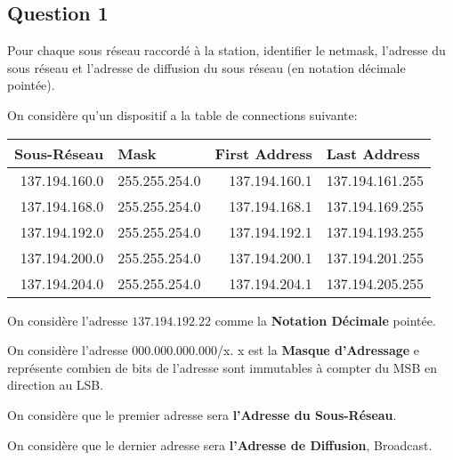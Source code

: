 \documentclass{article}
\begin{document}
\subsection*{Question 1}
\begin{exercise}
    Pour chaque sous réseau raccordé à la station, identifier le netmask, l'adresse du sous réseau et l'adresse de diffusion du sous réseau (en notation décimale pointée).
\end{exercise}
\begin{resolution}
    On considère qu'un dispositif a la table de connections suivante:
    \begin{table}[H]
        \centering\begin{tabular}{rl | rl}
            Sous-Réseau & Mask    & First Address & Last Address\\
            \hline\hline
            137.194.160.0 & 255.255.254.0 & 137.194.160.1 & 137.194.161.255\\
            137.194.168.0 & 255.255.254.0 & 137.194.168.1 & 137.194.169.255\\
            137.194.192.0 & 255.255.254.0 & 137.194.192.1 & 137.194.193.255\\
            137.194.200.0 & 255.255.254.0 & 137.194.200.1 & 137.194.201.255\\
            137.194.204.0 & 255.255.254.0 & 137.194.204.1 & 137.194.205.255\\
            \hline
        \end{tabular}
    \end{table}
    
    \begin{remark}
        On considère l'adresse $137.194.192.22$ comme la \textbf{Notation Décimale} pointée.
    \end{remark}
    \begin{remark}
        On considère l'adresse $000.000.000.000$/x. x est la \textbf{Masque d'Adressage} e représente combien de bits de l'adresse sont immutables à compter du MSB en direction au LSB.
    \end{remark}
    \begin{remark}
        On considère que le premier adresse sera \textbf{l'Adresse du Sous-Réseau}.
    \end{remark}
    \begin{remark}
        On considère que le dernier adresse sera \textbf{l'Adresse de Diffusion}, Broadcast.
    \end{remark}
\end{resolution}
\end{document}
